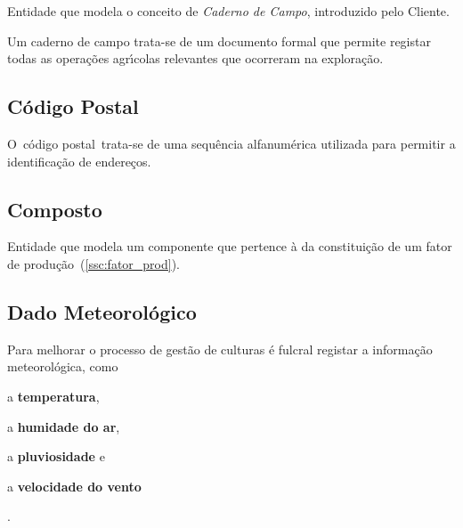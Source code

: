 \documentclass[12pt, a4paper]{article}
\begin{document}
Entidade que modela o conceito de \emph{Caderno de Campo}, introduzido pelo Cliente.

Um caderno de campo trata-se de um documento formal que permite registar todas as
opera\c{c}\~oes agr\'{\i}colas relevantes que ocorreram na explora\c{c}\~ao.


\subsection{C\'odigo Postal}\label{ssc:codigo_post}

O c\'odigo postal trata-se de uma sequ\^encia alfanum\'erica utilizada
para permitir a identifica\c{c}\~ao de endereços.



\subsection{Composto}\label{ssc:composto}

Entidade que modela um componente que pertence \`a da constitui\c{c}\~ao de um
fator de produ\c{c}\~ao~(\ref{ssc:fator_prod}).


\subsection{Dado Meteorol\'ogico}\label{ssc:dado_met}

Para melhorar o processo de gest\~ao de culturas \'e fulcral registar a informa\c{c}\~ao
meteorol\'ogica, como
\begin{enumerate*}[label = (\roman*)]
    \item a \textbf{temperatura},
    \item a \textbf{humidade do ar},
    \item a \textbf{pluviosidade}
        e
    \item a \textbf{velocidade do vento}
\end{enumerate*}.


\end{document}
